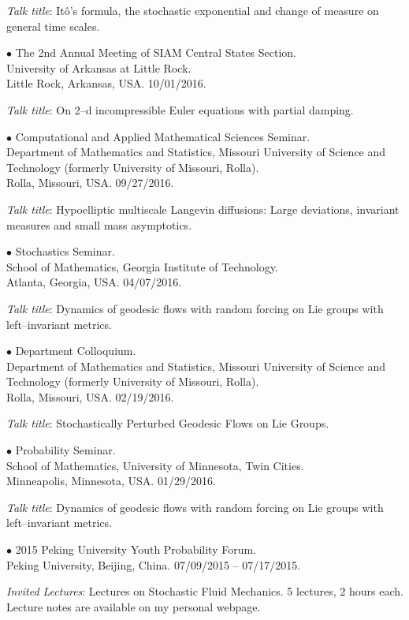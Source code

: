 \documentclass[margin,line]{res}
\begin{document}
\begin{resume}
\textit{Talk title}: It\^{o}'s formula, the stochastic exponential and change of
measure on general time scales.


{$\bullet$ The 2nd Annual Meeting of SIAM Central States Section. \\
University of Arkansas at Little Rock. \\
Little Rock, Arkansas, USA.} \hfill 10/01/2016.

\textit{Talk title}: On 2--d incompressible Euler equations with partial damping.


{$\bullet$ Computational and Applied Mathematical Sciences Seminar. \\
Department of Mathematics and Statistics, Missouri University of Science and Technology (formerly University of Missouri, Rolla). \\
Rolla, Missouri, USA.} \hfill 09/27/2016.

\textit{Talk title}: Hypoelliptic multiscale Langevin diffusions: Large deviations, invariant measures and small mass asymptotics.


{$\bullet$ Stochastics Seminar. \\
School of Mathematics, Georgia Institute of Technology. \\
Atlanta, Georgia, USA.} \hfill 04/07/2016.

\textit{Talk title}: Dynamics of geodesic flows with random forcing
on Lie groups with left--invariant metrics.


{$\bullet$ Department Colloquium. \\
Department of Mathematics and Statistics, Missouri University of Science and Technology (formerly University of Missouri, Rolla). \\
Rolla, Missouri, USA.} \hfill 02/19/2016.

\textit{Talk title}: Stochastically Perturbed Geodesic Flows on Lie
Groups.


{$\bullet$ Probability Seminar. \\
School of Mathematics, University of Minnesota, Twin Cities. \\
Minneapolis, Minnesota, USA.} \hfill 01/29/2016.

\textit{Talk title}: Dynamics of geodesic flows with random forcing
on Lie groups with left--invariant metrics.


{$\bullet$ 2015 Peking University Youth Probability Forum. \\
 Peking University, Beijing, China.} \hfill 07/09/2015 -- 07/17/2015.

\textit{Invited Lectures}: Lectures on Stochastic Fluid Mechanics. 5
lectures, 2 hours each. Lecture notes are available on my personal
webpage.



\end{resume}
\end{document}
